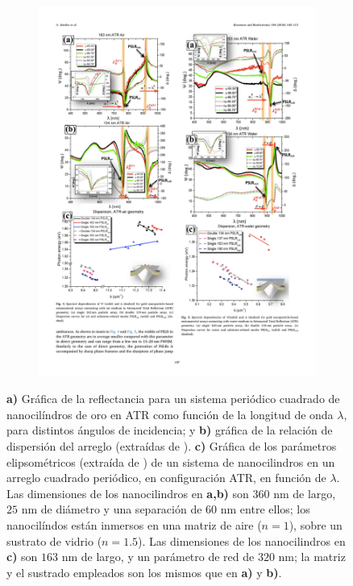 \documentclass[letterpaper,11pt] {article}
\begin{document}
\begin{figure}[h!]
		\begin{subfigure}{.33\linewidth}\includegraphics[scale=.7]{0-ATRSingleDanilov2018}\end{subfigure}
		\caption{\textbf{a)} Gráfica de la reflectancia  para un sistema periódico cuadrado de nanocilíndros de oro en ATR como función de la longitud de onda $\lambda$, para distintos ángulos de incidencia; y \textbf{b)} gráfica de la relación de dispersión  del arreglo  (extraídas de \cite{kabashin2009plasmonic}).  \textbf{c)} Gráfica de los parámetros elipsométricos (extraída de \cite{danilov2018ultra}) de un sistema de nanocilindros en un arreglo cuadrado periódico, en configuración ATR, en función de $\lambda$.  Las dimensiones de los nanocilindros en \textbf{a,b)} son $360$ nm de largo, $25$ nm de diámetro y una separación de $60$ nm entre ellos; los nanocilíndos están inmersos en una matriz de aire ($n=1$), sobre un sustrato de vidrio ($n=1. 5$).  Las dimensiones de los nanocilindros en \textbf{c)} son $163$ nm de largo, y un parámetro de red de $320$ nm; la matriz y el sustrado empleados son los mismos que en \textbf{a)} y \textbf{b)}. }\label{fig:GraphsPapers}
	\end{figure}
	
\end{document}

